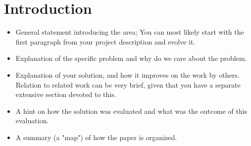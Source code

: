 \section{Introduction}
\begin{itemize}
\item General statement introducing the area; You can most likely start with the first paragraph from your project description and evolve it.
\item Explanation of the specific problem and why do we care about the problem.
\item Explanation of your solution, and how it improves on the work by others. Relation to related work can be very brief, given that you have a separate extensive section devoted to this.
\item A hint on how the solution was evaluated and what was the outcome of this evaluation.
\item A summary (a "map") of how the paper is organized.
\end{itemize}